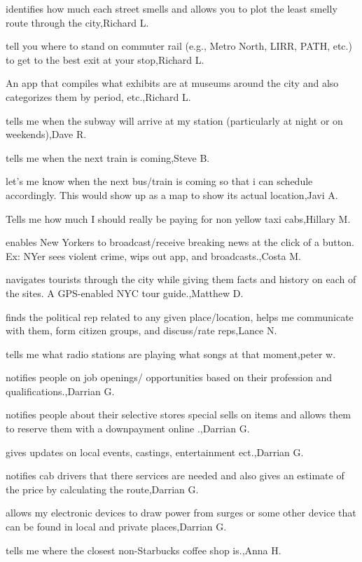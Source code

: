 \documentclass{article}
\begin{document}
identifies how much each street smells and allows you to plot the least smelly route through the city,Richard L.

tell you where to stand on commuter rail (e.g., Metro North, LIRR, PATH, etc.) to get to the best exit at your stop,Richard L.

An app that compiles what exhibits are at museums around the city and also categorizes them by period, etc.,Richard L.

tells me when the subway will arrive at my station (particularly at night or on weekends),Dave R.

tells me when the next train is coming,Steve B.

let's me know when the next bus/train is  coming so that i can schedule accordingly. This would show up as a map to show its actual location,Javi A.

 Tells me how much I should really be paying for non  yellow taxi cabs,Hillary M.

enables New Yorkers to broadcast/receive  breaking news at the click of a button. Ex: NYer sees violent crime, wips out app, and broadcasts.,Costa M.

navigates tourists through the city while giving them facts and history on each of the sites.  A GPS-enabled NYC tour guide.,Matthew D.

finds the political rep related to any given place/location, helps me communicate with them, form citizen groups, and discuss/rate reps,Lance N.

tells me what radio stations are playing what songs at that moment,peter w.

notifies people on job openings/ opportunities based on their profession and qualifications.,Darrian G.

notifies people about their selective stores special sells on items and allows them to reserve them with a downpayment online .,Darrian G.

gives updates on local events, castings, entertainment ect.,Darrian G.

notifies cab drivers that there services are needed and also gives an estimate of the price by calculating the route,Darrian G.

allows my electronic devices to draw power from surges or some other device that can be found in local and private places,Darrian G.

 tells me where the closest non-Starbucks coffee shop is.,Anna H.
\end{document}
